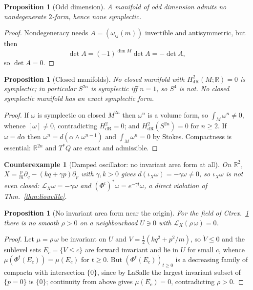 \documentclass[12pt,a4paper]{article}
\theoremstyle{definition}
\theoremstyle{plain}
\newtheorem{proposition}[definition]{Proposition}
\theoremstyle{commentary}
\newtheorem{counterexample}[definition]{Counterexample}
\newcommand{\R}{\mathbb{R}}
\begin{document}
\begin{proposition}[Odd dimension]\label{prop:odd}
A manifold of odd dimension admits no nondegenerate $2$-form, hence none symplectic.
\end{proposition}
\begin{proof}
Nondegeneracy needs $A=(\omega_{ij}(m))$ invertible and antisymmetric, but then
\[\det A=(-1)^{\dim M}\det A=-\det A,\]
so $\det A=0$.
\end{proof}

\begin{proposition}[Closed manifolds]\label{prop:closedS4}
No closed manifold with $H^2_{\mathrm{dR}}(M;\R)=0$ is symplectic; in particular $S^{2n}$ is
symplectic iff $n=1$, so $S^4$ is not. No closed symplectic manifold has an \emph{exact} symplectic
form.
\end{proposition}
\begin{proof}
If $\omega$ is symplectic on closed $M^{2n}$ then $\omega^n$ is a volume form, so
$\int_M\omega^n\ne0$, whence $[\omega]\ne0$, contradicting $H^2_{\mathrm{dR}}=0$; and
$H^2_{\mathrm{dR}}(S^{2n})=0$ for $n\ge2$. If $\omega=d\alpha$ then
$\omega^n=d(\alpha\wedge\omega^{n-1})$ and $\int_M\omega^n=0$ by Stokes. Compactness is essential:
$\R^{2n}$ and $T^*Q$ are exact and admissible.
\end{proof}

\begin{counterexample}[Damped oscillator: no invariant area form at all]\label{nonex:damped}
On $\R^2$, $X=\tfrac{p}{m}\partial_q-(kq+\gamma p)\partial_p$ with $\gamma,k>0$ gives
$d(\iota_X\omega)=-\gamma\omega\ne0$, so $\iota_X\omega$ is not even closed:
$\mathcal{L}_X\omega=-\gamma\omega$ and $(\Phi^t)^*\omega=e^{-\gamma t}\omega$, a direct violation of
Thm.~\ref{thm:liouville}.
\end{counterexample}

\begin{proposition}[No invariant area form near the origin]\label{prop:noarea}
For the field of Ctrex.~\ref{nonex:damped} there is no smooth $\rho>0$ on a neighbourhood $U\ni0$
with $\mathcal{L}_X(\rho\,\omega)=0$.
\end{proposition}
\begin{proof}
Let $\mu=\rho\,\omega$ be invariant on $U$ and $V=\tfrac12(kq^2+p^2/m)$, so $\dot V\le0$ and the
sublevel sets $E_c=\{V\le c\}$ are forward invariant and lie in $U$ for small $c$, whence
$\mu(\Phi^t(E_c))=\mu(E_c)$ for $t\ge0$. But $(\Phi^t(E_c))_{t\ge0}$ is a decreasing family of
compacta with intersection $\{0\}$, since by LaSalle the largest invariant subset of $\{p=0\}$ is
$\{0\}$; continuity from above gives $\mu(E_c)=0$, contradicting $\rho>0$.
\end{proof}
\end{document}
